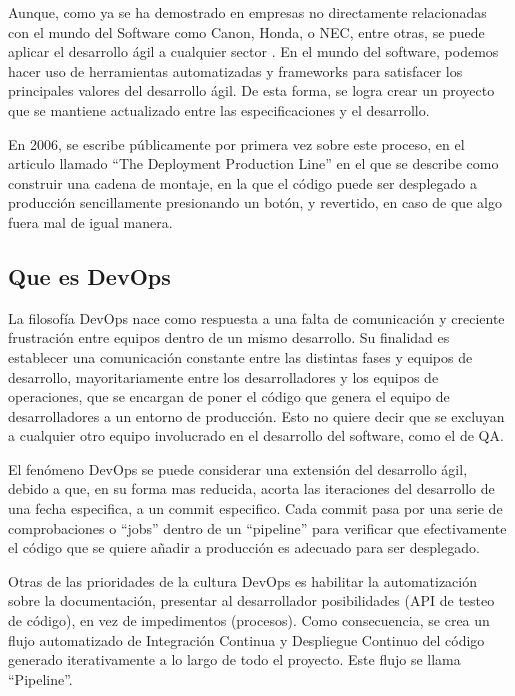 \documentclass[12pt]{report} %
\begin{document}
Aunque, como ya se ha demostrado en empresas no directamente relacionadas con el
mundo del Software como Canon, Honda, o NEC, entre otras, se puede aplicar el
desarrollo ágil a cualquier sector \cite{Hirotaka1986}.  En el mundo del
software, podemos hacer uso de herramientas automatizadas y frameworks para
satisfacer los principales valores del desarrollo ágil.  De esta forma, se logra
crear un proyecto que se mantiene actualizado entre las especificaciones y el
desarrollo.

En 2006, se escribe públicamente por primera vez sobre este proceso, en el
articulo llamado ``The Deployment Production Line'' en el que se describe como
construir una cadena de montaje, en la que el código puede ser desplegado a
producción sencillamente presionando un botón, y revertido, en caso de que algo
fuera mal de igual manera. \cite{10.1109/AGILE.2006.53}

\subsection{Que es DevOps}


La filosofía DevOps nace como respuesta a una falta de comunicación y creciente
frustración entre equipos dentro de un mismo desarrollo. Su finalidad es
establecer una comunicación constante entre las distintas fases y equipos de
desarrollo, mayoritariamente entre los desarrolladores y los equipos de
operaciones, que se encargan de poner el código que genera el equipo de
desarrolladores a un entorno de producción. Esto no quiere decir que se excluyan
a cualquier otro equipo involucrado en el desarrollo del software, como el de
QA.

El fenómeno DevOps se puede considerar una extensión del desarrollo ágil, debido
a que, en su forma mas reducida, acorta las iteraciones del desarrollo de una
fecha especifica, a un commit especifico. \cite{dobra2018} Cada commit pasa por
una serie de comprobaciones o ``jobs'' dentro de un ``pipeline'' para verificar
que efectivamente el código que se quiere añadir a producción es adecuado para
ser desplegado.

Otras de las prioridades de la cultura DevOps es habilitar la automatización
sobre la documentación, presentar al desarrollador posibilidades (API de testeo
de código), en vez de impedimentos (procesos). Como consecuencia, se crea un
flujo automatizado de Integración Continua y Despliegue Continuo del código
generado iterativamente a lo largo de todo el proyecto. Este flujo se llama
``Pipeline''.
\end{document}
